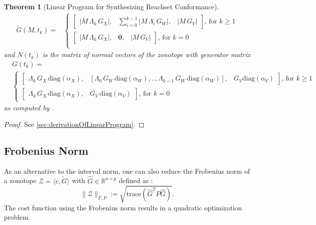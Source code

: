\documentclass[EPiC]{easychair}
\renewcommand{\^}[1]{^{(#1)}}
\newtheorem{theorem}{Theorem}
\begin{document}
\begin{theorem}[Linear Program for Synthesizing Reachset Conformance]
\begin{align}
  \tilde{G}(M,t_k) =& \begin{cases}
      \begin{bmatrix} 
       |M \, \Lambda_k \, G_X|, & \sum_{i=0}^{k-1} |M \, \Lambda_i \, G_W |, & |M \, G_V |
      \end{bmatrix} \text{, for } k\geq 1 \\
      \begin{bmatrix} 
       |M \, \Lambda_k \, G_X|, & \mathbf{0}, & |M \, G_V |
      \end{bmatrix} \text{, for } k=0 \\
                      \end{cases} \label{eq:tilde_G}
 \end{align}
 and $N(t_k)$ is the matrix of normal vectors of the zonotope with generator matrix 
 \begin{equation} \label{eq:generatorMatrix}
 \begin{split}
 &G(t_k) = \\
 &\begin{cases}
           \begin{bmatrix} \Lambda_k \, G_X \, \mathrm{diag}(\alpha_X), & [\Lambda_0  \, G_W \, \mathrm{diag}(\alpha_W), .., \Lambda_{k-1} \, G_W \, \mathrm{diag}(\alpha_W)], & G_V \mathrm{diag}(\alpha_V) \end{bmatrix} \text{, for } k\geq1 \\[0.2cm]
           \begin{bmatrix} \Lambda_k  \, G_X \, \mathrm{diag}(\alpha_X), & G_V \, \mathrm{diag}(\alpha_V) \end{bmatrix} \text{, for } k = 0
          \end{cases}
 \end{split}
 \end{equation}
 as computed by \cite[Thm.~7]{Althoff2010d}.
\end{theorem}
\begin{proof}
 See \cref{sec:derivationOfLinearProgram}.
\end{proof}

\subsection{Frobenius Norm}

As an alternative to the interval norm, one can also reduce the Frobenius norm of a zonotope $\mathcal{Z}=\langle c, \tilde{G} \rangle$ with $\hat{G} \in \mathbb{R}^{n \times p}$ defined as \cite[Def.~2]{Combastel2015}:
	\begin{equation} \label{eq:FrobeniusNorm}
		\|\mathcal{Z}\|_{F,P} := \sqrt{\mathrm{trace}(\hat{G}^T P \hat{G})}.
	\end{equation}
The cost function using the Frobenius norm results in a quadratic optimization problem.
\end{document}
